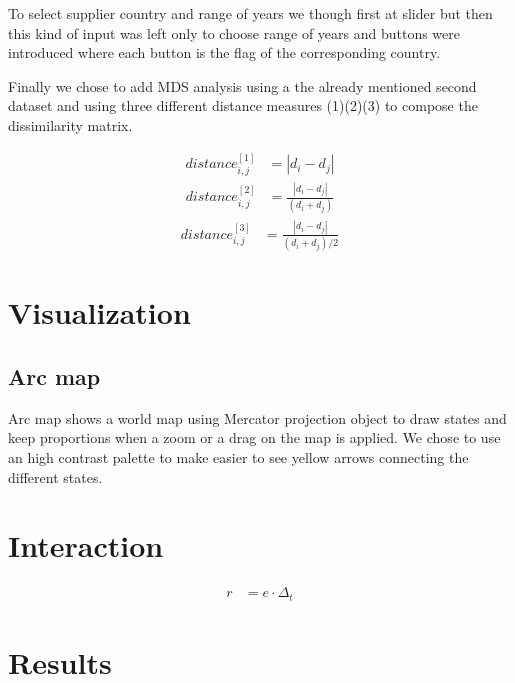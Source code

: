 \documentclass[twocolumn]{article}
\begin{document}
To select supplier country and range of years we though first at slider but then this kind of input was left only to choose range of years and buttons were introduced where each button is the flag of the corresponding country. 

Finally we chose to add MDS analysis using a the already mentioned second dataset and using three different distance measures (1)(2)(3) to compose the dissimilarity matrix.

\begin{align}
    distance_{i,j}^{[1]} &= | d_i-d_j | \label{eq:distance 1}
\end{align}
\begin{align}
    distance_{i,j}^{[2]} &= \frac{|d_i-d_j|}{(d_i+d_j)}\label{eq:distance 1}
\end{align}
\begin{align}
    distance_{i,j}^{[3]} &= \frac{|d_i-d_j|}{(d_i+d_j)/2} \label{eq:distance 1}
\end{align}


\section{Visualization}
\subsection{Arc map}
Arc map shows a world map using Mercator projection object to draw states and keep proportions when a zoom or a drag on the map is applied. We chose to use an high contrast palette to make easier to see yellow arrows connecting the different states.  
\section{Interaction}


\begin{align}
    r &= e \cdot \Delta_t \label{eq:abc}
\end{align}


\section{Results}
\end{document}
